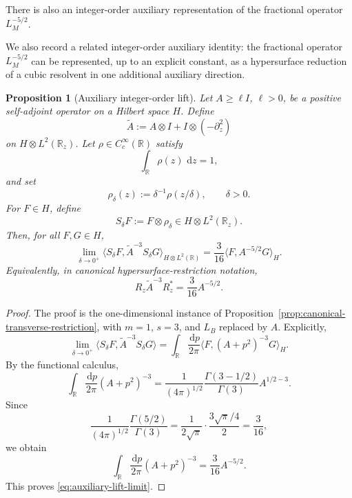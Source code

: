 \documentclass[11pt]{article}
\newtheorem{proposition}[theorem]{Proposition}
\newcommand{\R}{\mathbb{R}}
\newcommand{\dd}{\,\mathrm{d}}
\begin{document}
There is also an integer-order auxiliary representation of the fractional
operator \(L_M^{-5/2}\).  

We also record a related integer-order auxiliary identity: the fractional
operator \(L_M^{-5/2}\) can be represented, up to an explicit constant, as a
hypersurface reduction of a cubic resolvent in one additional auxiliary
direction.

\begin{proposition}[Auxiliary integer-order lift]
\label{prop:auxiliary-integer-lift}
Let \(A\geq \ell I\), \(\ell>0\), be a positive self-adjoint operator on a
Hilbert space \(H\).  Define
\[
    \widetilde A:=A\otimes I+I\otimes(-\partial_z^2)
\]
on \(H\otimes L^2(\R_z)\).  Let \(\rho\in C_c^\infty(\R)\) satisfy
\[
    \int_{\R}\rho(z)\,\dd z=1,
\]
and set
\[
    \rho_\delta(z):=\delta^{-1}\rho(z/\delta),
    \qquad \delta>0.
\]
For \(F\in H\), define
\[
    S_\delta F:=F\otimes\rho_\delta\in H\otimes L^2(\R_z).
\]
Then, for all \(F,G\in H\),
\begin{equation}
    \lim_{\delta\to0^+}
    \big\langle S_\delta F,\widetilde A^{-3}S_\delta G
    \big\rangle_{H\otimes L^2(\R)}
    =
    \frac{3}{16}
    \big\langle F,A^{-5/2}G\big\rangle_H .
    \label{eq:auxiliary-lift-limit}
\end{equation}
Equivalently, in canonical hypersurface-restriction notation,
\begin{equation}
    R_z\widetilde A^{-3}R_z^\ast
    =
    \frac{3}{16}A^{-5/2}.
    \label{eq:auxiliary-lift-formal}
\end{equation}
\end{proposition}

\begin{proof}
The proof is the one-dimensional instance of
Proposition~\ref{prop:canonical-transverse-restriction}, with \(m=1\),
\(s=3\), and \(L_B\) replaced by \(A\).  Explicitly,
\[
    \lim_{\delta\to0^+}
    \big\langle S_\delta F,\widetilde A^{-3}S_\delta G
    \big\rangle
    =
    \int_{\R}\frac{\dd p}{2\pi}
    \big\langle F,(A+p^2)^{-3}G\big\rangle_H .
\]
By the functional calculus,
\[
    \int_{\R}\frac{\dd p}{2\pi}(A+p^2)^{-3}
    =
    \frac{1}{(4\pi)^{1/2}}
    \frac{\Gamma(3-1/2)}{\Gamma(3)}
    A^{1/2-3}.
\]
Since
\[
    \frac{1}{(4\pi)^{1/2}}
    \frac{\Gamma(5/2)}{\Gamma(3)}
    =
    \frac{1}{2\sqrt{\pi}}\cdot
    \frac{3\sqrt{\pi}/4}{2}
    =
    \frac{3}{16},
\]
we obtain
\[
    \int_{\R}\frac{\dd p}{2\pi}(A+p^2)^{-3}
    =
    \frac{3}{16}A^{-5/2}.
\]
This proves \eqref{eq:auxiliary-lift-limit}.
\end{proof}
\end{document}

